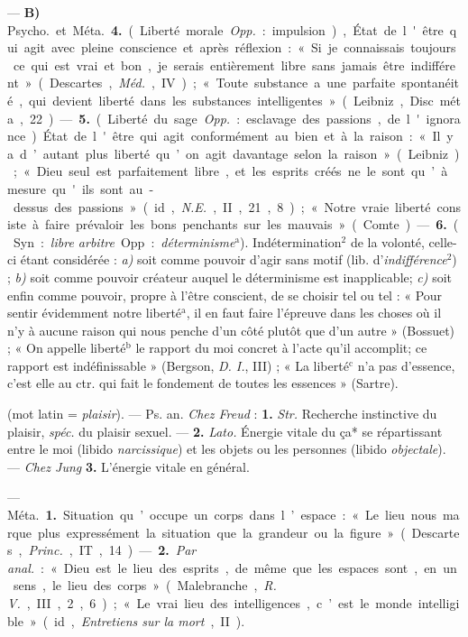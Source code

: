 \begin{itemize}[leftmargin=1cm, label=, itemsep=1pt]
— {\bf B)} \si{Psycho.} et \si{Méta.} {\bf 4.} (Liberté morale. {\it Opp.} :
impulsion), État de l'être qui agit avec pleine conscience et après
réflexion : « Si je connaissais toujours ce qui est vrai et bon,... je serais
entièrement libre sans jamais être indifférent » (Descartes, {\it Méd.},
IV) ; « Toute substance a une parfaite spontanéité, qui devient liberté dans
les substances intelligentes » (Leibniz, Disc. méta., 22). —
{\bf 5.} (Liberté du sage. {\it Opp.} : esclavage des passions, de
l'ignorance). État de l'être qui agit conformément au bien et à la raison :
« Il y a d’autant plus liberté qu’on agit davantage selon la
raison » (Leibniz) ; « Dieu seul est parfaitement libre, et les esprits créés
ne le sont qu’à mesure qu'ils sont au-dessus des passions » (id., {\it N.E.},
II, 21, 8) ; « Notre vraie liberté consiste à faire prévaloir les bons
penchants sur les mauvais » (Comte). — {\bf 6.} (Syn. : {\it libre arbitre}.
Opp. : {\it déterminisme}$^\text{a}$). Indétermination$^2$ de la volonté,
celle-ci étant considérée : {\it a)} soit comme pouvoir d’agir sans motif
(lib. d’{\it indifférence}$^2$) ; {\it b)} soit comme pouvoir créateur auquel
le déterminisme est inapplicable; {\it c)} soit enfin comme pouvoir, propre à
l'être conscient, de se choisir tel ou tel : « Pour sentir évidemment notre
liberté$^\text{a}$, il en faut faire l'épreuve dans les choses où il n’y à
aucune raison qui nous penche d’un côté plutôt que d’un autre » (Bossuet) ;
« On appelle liberté$^\text{b}$ le rapport du moi concret à l'acte qu'il
accomplit; ce rapport est indéfinissable » (Bergson, {\it D. I.}, III) ; « La
liberté$^\text{c}$ n’a pas d'essence, c’est elle au ctr. qui fait le
fondement de toutes les essences » (Sartre).

 (mot latin = {\it plaisir}). — Ps. an. {\it Chez Freud} : {\bf 1.}
{\it Str.} Recherche instinctive du plaisir, {\it spéc.} du plaisir sexuel. —
{\bf 2.} {\it Lato.} Énergie vitale du ça* se répartissant entre le moi
(libido {\it narcissique}) et les objets ou les personnes (libido
{\it objectale}). — {\it Chez Jung} {\bf 3.} L'énergie vitale en général.

 — \si{Méta.} {\bf 1.} Situation qu’occupe un corps dans l’espace :
« Le lieu nous marque plus expressément la situation que la grandeur ou la
figure » (Descartes, {\it Princ.}, IT, 14). — {\bf 2.} {\it Par anal.} :
« Dieu est le lieu des esprits, de même que les espaces sont, en un sens, le
lieu des corps » (Malebranche, {\it R. V.}, III, 2, 6) ; « Le vrai lieu des
intelligences, c’est le monde intelligible » (id., {\it Entretiens sur la
mort}, II).


\end{itemize}

